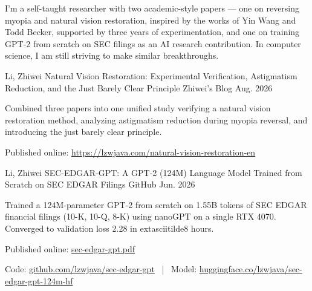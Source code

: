 
\begin{cvparagraph}
  I'm a self-taught researcher with two academic-style papers — one on reversing myopia and natural vision restoration, inspired by the works of Yin Wang and Todd Becker, supported by three years of experimentation, and one on training GPT-2 from scratch on SEC filings as an AI research contribution. In computer science, I am still striving to make similar breakthroughs.\end{cvparagraph}

\begin{cventries}

  \cventry
    {Li, Zhiwei} %
    {Natural Vision Restoration: Experimental Verification, Astigmatism Reduction, and the Just Barely Clear Principle} %
    {Zhiwei's Blog} %
    {Aug. 2026} %
    {
      \begin{cvitems}
        \item {Combined three papers into one unified study verifying a natural vision restoration method, analyzing astigmatism reduction during myopia reversal, and introducing the just barely clear principle.}
        \item {Published online: \href{https://lzwjava.com/natural-vision-restoration-en}{https://lzwjava.com/natural-vision-restoration-en}}
      \end{cvitems}
    }

  \cventry
    {Li, Zhiwei} %
    {SEC-EDGAR-GPT: A GPT-2 (124M) Language Model Trained from Scratch on SEC EDGAR Filings} %
    {GitHub} %
    {Jun. 2026} %
    {
      \begin{cvitems}
        \item {Trained a 124M-parameter GPT-2 from scratch on 1.55B tokens of SEC EDGAR financial filings (10-K, 10-Q, 8-K) using nanoGPT on a single RTX 4070. Converged to validation loss 2.28 in 	extasciitilde8 hours.}
        \item {Published online: \href{https://github.com/lzwjava/sec-edgar-gpt/raw/main/sec-edgar-gpt.pdf}{sec-edgar-gpt.pdf}}
        \item {Code: \href{https://github.com/lzwjava/sec-edgar-gpt}{github.com/lzwjava/sec-edgar-gpt} \ | \ Model: \href{https://huggingface.co/lzwjava/sec-edgar-gpt-124m-hf}{huggingface.co/lzwjava/sec-edgar-gpt-124m-hf}}
      \end{cvitems}
    }

\end{cventries}
